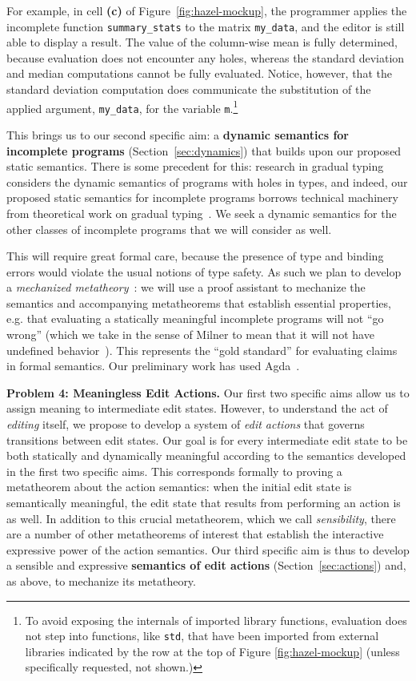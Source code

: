 \documentclass{purple}
\let\li\lstinline
\begin{document}
For example, in cell \textbf{(c)} of Figure~\ref{fig:hazel-mockup}, the
programmer applies  the incomplete function \li{summary_stats} to 
the matrix \lstinline{my_data}, and 
the editor is still able to display a result.
The value of the column-wise mean is fully determined, because evaluation does
not encounter any holes, whereas the standard deviation and median computations
cannot be fully evaluated. Notice, however, that the standard
deviation computation does communicate the substitution of the applied argument,
\li{my_data}, for the variable \li{m}.\footnote{To avoid exposing the internals
of imported library functions, evaluation does not step into functions, like
\li{std}, that have been imported from external libraries indicated by the row at the top of Figure \ref{fig:hazel-mockup} (unless specifically
requested, not shown.)}

This brings us to our second specific aim: a
\textbf{dynamic semantics for incomplete programs} (Section~\ref{sec:dynamics}) that builds upon our proposed
static semantics. There is some precedent for this: research in gradual typing
considers the dynamic semantics of programs with holes in types, and indeed, our
proposed static semantics for incomplete programs borrows technical machinery
from theoretical work on gradual typing~\cite{Siek06a}. We seek a dynamic semantics for the
other classes of incomplete programs that we will consider as well.

This will require great formal care, because the presence of type
and binding errors would violate the usual notions of type safety. As such we plan to develop a \emph{mechanized
  metatheory}~\cite{Lee:2007:TMM:1190216.1190245}: we will use a proof assistant to mechanize the semantics and
accompanying metatheorems that establish essential properties, e.g. that
evaluating a statically meaningful incomplete programs will not ``go wrong'' (which we take in
the sense of Milner to mean that it will not have undefined behavior~\cite{milner1978theory,pfpl}).
This represents the ``gold standard'' for evaluating claims in formal
semantics.  Our preliminary work has used Agda~\cite{norell2009dependently}.

\vspace{0.25ex}
\noindent\textbf{Problem 4: Meaningless Edit Actions.} Our first two specific aims
allow us to assign meaning to intermediate edit states. However, to
understand the act of \emph{editing} itself, we propose to develop a system of
\emph{edit actions} that governs transitions between edit
states. Our goal is for every intermediate edit state to be both statically and
dynamically meaningful according to the semantics developed in the first two
specific aims. This corresponds formally to proving a
metatheorem about the action semantics: when the initial edit state is
semantically meaningful, the edit state that results from performing an action
is as well. In addition to this crucial metatheorem, which
we call \emph{sensibility}, there are a number of other metatheorems of interest
that establish the interactive expressive power of the action semantics. Our third specific
aim is thus to develop a sensible and expressive \textbf{semantics of edit actions} (Section~\ref{sec:actions})
and, as above, to mechanize its metatheory.
\end{document}
